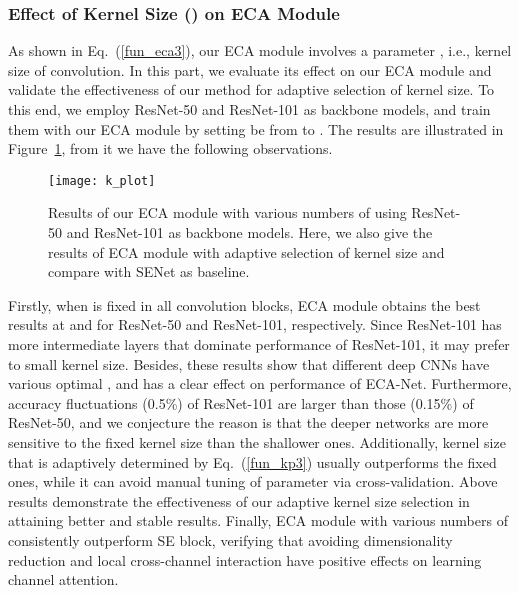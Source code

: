 \documentclass[10pt,twocolumn,letterpaper]{article}
\begin{document}
\subsubsection{Effect of Kernel Size () on ECA Module}
As shown in Eq.~(\ref{fun_eca3}), our ECA module involves a parameter , i.e., kernel size of  convolution. In this part, we evaluate its effect on our ECA module and validate the effectiveness of our method for adaptive selection of kernel size. To this end, we employ ResNet-50 and ResNet-101 as backbone models, and train them with our ECA module by setting  be from  to . The results are illustrated in Figure~\ref{fig4}, from it we have the following observations. 

\begin{figure}[h]
	\centering
	\texttt{[image: k\_plot]} \caption{Results of our ECA module with various numbers of  using ResNet-50 and ResNet-101 as backbone models. Here, we also give the results of ECA module with adaptive selection of kernel size and compare with SENet as baseline.}
	\label{fig4}
\end{figure}

Firstly, when  is fixed in all convolution blocks, ECA module obtains the best results at  and  for ResNet-50 and ResNet-101, respectively. Since ResNet-101 has more intermediate layers that dominate performance of ResNet-101, it may prefer to small kernel size. Besides, these results show that different deep CNNs have various optimal , and  has a clear effect on performance of ECA-Net. Furthermore, accuracy fluctuations (0.5\%) of ResNet-101 are larger than those (0.15\%) of ResNet-50, and we conjecture the reason is that the deeper networks are more sensitive to the fixed kernel size than the shallower ones. Additionally, kernel size that is adaptively determined by Eq.~(\ref{fun_kp3}) usually outperforms the fixed ones, while it can avoid manual tuning of parameter  via cross-validation. Above results demonstrate the effectiveness of our adaptive kernel size selection in attaining better and stable results. Finally, ECA module with various numbers of  consistently outperform SE block, verifying that avoiding dimensionality reduction and local cross-channel interaction have positive effects on learning channel attention.
\end{document}
